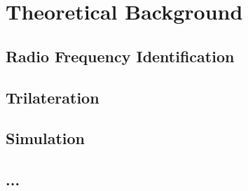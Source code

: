\section{Theoretical Background} 

\subsection{Radio Frequency Identification}

\subsection{Trilateration}

\subsection{Simulation}

\subsection{...}